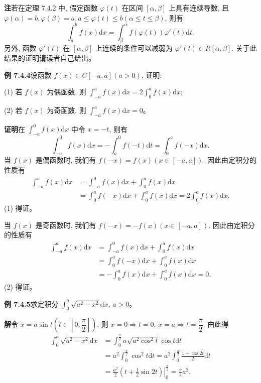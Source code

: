 \documentclass[UTF8, 12pt, fontset=fandol, oneside]{ctexart}
\begin{document}
\noindent\textbf{注}\quad 若在定理 7.4.2 中, 假定函数 $\varphi(t)$ 在区间 $[\alpha,\beta]$ 上具有连续导数, 且 $\varphi(\alpha)=b,\varphi(\beta)=a,a\leq\varphi(t)\leq b(\alpha\leq t\leq\beta)$, 则有
\[
  \int_a^b f(x)\mathrm dx=\int_\beta^\alpha f(\varphi(t))\varphi'(t)\mathrm dt.
\]
另外, 函数 $\varphi'(t)$ 在 $[\alpha,\beta]$ 上连续的条件可以减弱为 $\varphi'(t)\in R[\alpha,\beta]$. 关于此结果的证明请读者自己给出。

\noindent\textbf{例 7.4.4}\quad 设函数 $f(x)\in C[-a,a](a>0)$, 证明:

(1) 若 $f(x)$ 为偶函数, 则 $\int_{-a}^a f(x)\mathrm dx=2\int_0^a f(x)\mathrm dx$;

(2) 若 $f(x)$ 为奇函数, 则 $\int_{-a}^a f(x)\mathrm dx=0$。

\noindent\textbf{证明}\quad 在 $\int_{-a}^0 f(x)\mathrm dx$ 中令 $x=-t$, 则有
\[
  \int_{-a}^0 f(x)\mathrm dx=-\int_a^0 f(-t)\mathrm dt=\int_0^a f(-x)\mathrm dx.
\]
当 $f(x)$ 是偶函数时, 我们有 $f(-x)=f(x)(x\in[-a,a])$. 因此由定积分的性质有
\[
\begin{aligned}
  \int_{-a}^a f(x)\mathrm dx
  &=\int_{-a}^0 f(x)\mathrm dx+\int_0^a f(x)\mathrm dx\\
  &=\int_0^a f(-x)\mathrm dx+\int_0^a f(x)\mathrm dx
  =2\int_0^a f(x)\mathrm dx.
\end{aligned}
\]
(1) 得证。

当 $f(x)$ 是奇函数时, 我们有 $f(-x)=-f(x)(x\in[-a,a])$. 因此由定积分的性质有
\[
\begin{aligned}
  \int_{-a}^a f(x)\mathrm dx
  &=\int_{-a}^0 f(x)\mathrm dx+\int_0^a f(x)\mathrm dx\\
  &=\int_0^a f(-x)\mathrm dx+\int_0^a f(x)\mathrm dx\\
  &=-\int_0^a f(x)\mathrm dx+\int_0^a f(x)\mathrm dx=0.
\end{aligned}
\]
(2) 得证。

\noindent\textbf{例 7.4.5}\quad 求定积分 $\int_0^a \sqrt{a^2-x^2}\mathrm dx$, $a>0$。

\noindent\textbf{解}\quad 令 $x=a\sin t\left(t\in\left[0,\dfrac{\pi}{2}\right]\right)$, 则 $x=0\Rightarrow t=0$, $x=a\Rightarrow t=\dfrac{\pi}{2}$. 由此得
\[
\begin{aligned}
  \int_0^a \sqrt{a^2-x^2}\mathrm dx
  &=\int_0^{\frac{\pi}{2}} a\sqrt{a^2\cos^2 t}\cos t\mathrm dt\\
  &=a^2\int_0^{\frac{\pi}{2}}\cos^2 t\mathrm dt
  =a^2\int_0^{\frac{\pi}{2}}\frac{1+\cos 2t}{2}\mathrm dt\\
  &=\frac{a^2}{2}\left.\left(t+\frac{1}{2}\sin 2t\right)\right|_0^{\frac{\pi}{2}}
  =\frac{\pi}{4}a^2.
\end{aligned}
\]
\end{document}

